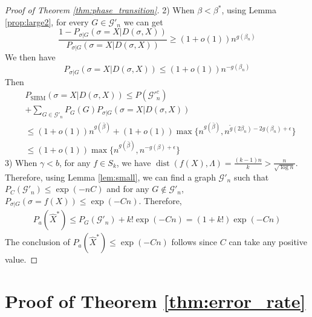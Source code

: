\documentclass[journal]{IEEEtran}
\newcommand{\cG}{\mathcal{G}}
\newcommand{\1}{\mathbbm{1}}
\DeclareMathOperator{\SIBM}{SIBM}
\DeclareMathOperator{\dist}{dist}
\begin{document}
\begin{proof}[Proof of Theorem \ref{thm:phase_transition}]
	2) When $\beta < \beta^*$, using Lemma \ref{prop:large2}, for every $G \in \cG'_n$
	we can get
	$$
	\frac{1-P_{\sigma | G}(\sigma=X | D(\sigma, X))}{P_{\sigma | G}(\sigma=X | D(\sigma, X))}\geq (1+o(1))n^{g(\beta_n)}
	$$
	We then have
	$$
	P_{\sigma | G}(\sigma=X| D(\sigma, X)) \leq (1+o(1)) n^{-g(\beta_n)}
	$$
	Then
	\begin{align*}
	&P_{\SIBM}(\sigma=X| D(\sigma, X))  \leq  P(\cG'^c_n) \\
	&+ \sum_{G\in \cG'_n}P_G(G) P_{\sigma|G}(\sigma=X| D(\sigma, X)) \\
	& \leq (1+o(1))n^{g(\bar{\beta})} + (1+o(1)) \max\{n^{g(\bar{\beta})}, n^{\tilde{g}(2\beta_n) - 2g(\beta_n) + \epsilon} \}\\
	& \leq (1+o(1)) \max\{n^{g(\bar{\beta})}, n^{-g(\beta) + \epsilon}  \}
	\end{align*}
	3) When $\gamma < b$, for any $f\in S_k$, we have $\dist(f(X), \Lambda) = \frac{(k-1)n}{k} > \frac{n}{\sqrt{\log n}}$.
	Therefore, using Lemma \ref{lem:small}, we can find a graph $\cG'_n$ such that $P_C(\cG'_n) \leq \exp(-nC)$
	and for any $G\not \in \cG'_n$, $P_{\sigma |G}(\sigma = f(X)) \leq \exp(-Cn)$. Therefore,
	\begin{align*}
	P_a(\hat{X}^*) \leq P_G(\cG'_n) + k! \exp(-Cn) = (1+k!)\exp(-Cn)
	\end{align*}
	The conclusion of $P_a(\hat{X}^*) \leq \exp(-Cn)$ follows since $C$ can take any positive value.
\end{proof}

\section*{Proof of Theorem \ref{thm:error_rate}}
\end{document}
